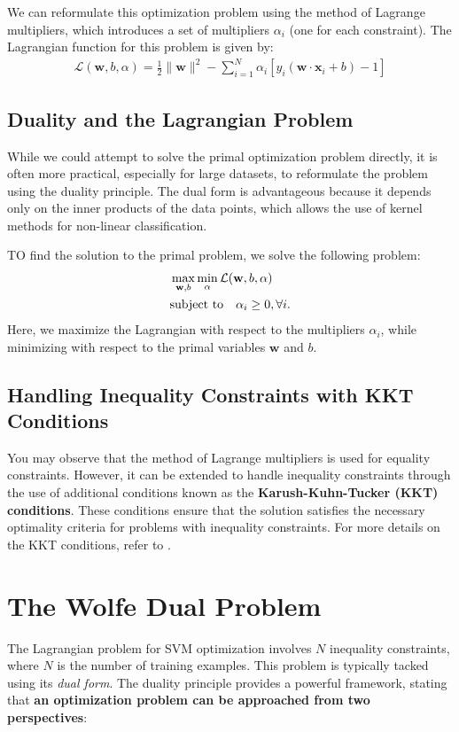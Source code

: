 We can reformulate this optimization problem using the method of Lagrange multipliers, which introduces a set of multipliers $\alpha_i$ (\cf one for each constraint). The Lagrangian function for this problem is given by:
\begin{align*}
	\mathcal{L}(\mathbf{w}, b, \alpha) = \frac{1}{2}\lVert \mathbf{w}\rVert ^2 - \sum_{i=1}^N \alpha_i \left[y_i(\mathbf{w}\cdot \mathbf{x}_i+b)-1\right]
\end{align*}

\subsection{Duality and the Lagrangian Problem}

While we could attempt to solve the primal optimization problem directly, it is often more practical, especially for large datasets, to reformulate the problem using the duality principle. The dual form is advantageous because it depends only on the inner products of the data points, which allows the use of kernel methods for non-linear classification.

TO find the solution to the primal problem, we solve the following problem:
\begin{align*}
	&\max_{\mathbf{w}, b}\min_\alpha \mathcal{L}({\mathbf{w}}, b, \alpha)\\
	&\textrm{subject to}\quad \alpha_i\geq 0, \forall i.
\end{align*}
Here, we maximize the Lagrangian with respect to the multipliers $\alpha_i$, while minimizing with respect to the primal variables $\mathbf{w}$ and $b$.

\subsection{Handling Inequality Constraints with KKT Conditions}

You may observe that the method of Lagrange multipliers is used for equality constraints. However, it can be extended to handle inequality constraints through the use of additional conditions known as the \textbf{Karush-Kuhn-Tucker (KKT) conditions}. These conditions ensure that the solution satisfies the necessary optimality criteria for problems with inequality constraints. For more details on the KKT conditions, refer to . 

\section{The Wolfe Dual Problem}
The Lagrangian problem for SVM optimization involves $N$ inequality constraints, where $N$ is the number of training examples. This problem is typically tacked using its \textit{dual form}. The duality principle provides a powerful framework, stating that \textbf{an optimization problem can be approached from two perspectives}: 

